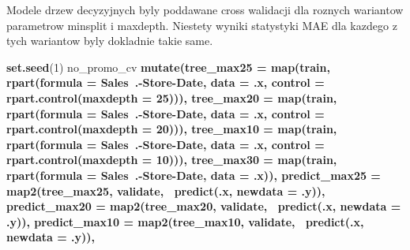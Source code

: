 \documentclass[]{article}
\newenvironment{Shaded}{\begin{snugshade}}{\end{snugshade}}
\newcommand{\DataTypeTok}[1]{\textcolor[rgb]{0.13,0.29,0.53}{#1}}
\newcommand{\DecValTok}[1]{\textcolor[rgb]{0.00,0.00,0.81}{#1}}
\newcommand{\KeywordTok}[1]{\textcolor[rgb]{0.13,0.29,0.53}{\textbf{#1}}}
\newcommand{\NormalTok}[1]{#1}
\newcommand{\OperatorTok}[1]{\textcolor[rgb]{0.81,0.36,0.00}{\textbf{#1}}}
\newcommand{\StringTok}[1]{\textcolor[rgb]{0.31,0.60,0.02}{#1}}
\begin{document}
Modele drzew decyzyjnych byly poddawane cross walidacji dla roznych
wariantow parametrow minsplit i maxdepth. Niestety wyniki statystyki MAE
dla kazdego z tych wariantow byly dokladnie takie same.

\begin{Shaded}
\begin{Highlighting}[]
\KeywordTok{set.seed}\NormalTok{(}\DecValTok{1}\NormalTok{)}
\NormalTok{no_promo_cv }\OperatorTok{%>%}\StringTok{ }
\StringTok{  }\KeywordTok{mutate}\NormalTok{(}\DataTypeTok{tree_max25 =} \KeywordTok{map}\NormalTok{(train, }\OperatorTok{~}\StringTok{ }\KeywordTok{rpart}\NormalTok{(}\DataTypeTok{formula =}\NormalTok{ Sales}\OperatorTok{~}\NormalTok{.}\OperatorTok{-}\NormalTok{Store}\OperatorTok{-}\NormalTok{Date, }\DataTypeTok{data =}\NormalTok{ .x, }\DataTypeTok{control =} \KeywordTok{rpart.control}\NormalTok{(}\DataTypeTok{maxdepth =} \DecValTok{25}\NormalTok{))),}
         \DataTypeTok{tree_max20 =} \KeywordTok{map}\NormalTok{(train, }\OperatorTok{~}\StringTok{ }\KeywordTok{rpart}\NormalTok{(}\DataTypeTok{formula =}\NormalTok{ Sales}\OperatorTok{~}\NormalTok{.}\OperatorTok{-}\NormalTok{Store}\OperatorTok{-}\NormalTok{Date, }\DataTypeTok{data =}\NormalTok{ .x, }\DataTypeTok{control =} \KeywordTok{rpart.control}\NormalTok{(}\DataTypeTok{maxdepth =} \DecValTok{20}\NormalTok{))),}
         \DataTypeTok{tree_max10 =} \KeywordTok{map}\NormalTok{(train, }\OperatorTok{~}\StringTok{ }\KeywordTok{rpart}\NormalTok{(}\DataTypeTok{formula =}\NormalTok{ Sales}\OperatorTok{~}\NormalTok{.}\OperatorTok{-}\NormalTok{Store}\OperatorTok{-}\NormalTok{Date, }\DataTypeTok{data =}\NormalTok{ .x, }\DataTypeTok{control =} \KeywordTok{rpart.control}\NormalTok{(}\DataTypeTok{maxdepth =} \DecValTok{10}\NormalTok{))),}
         \DataTypeTok{tree_max30 =} \KeywordTok{map}\NormalTok{(train, }\OperatorTok{~}\StringTok{ }\KeywordTok{rpart}\NormalTok{(}\DataTypeTok{formula =}\NormalTok{ Sales}\OperatorTok{~}\NormalTok{.}\OperatorTok{-}\NormalTok{Store}\OperatorTok{-}\NormalTok{Date, }\DataTypeTok{data =}\NormalTok{ .x)),}
         \DataTypeTok{predict_max25 =} \KeywordTok{map2}\NormalTok{(tree_max25, validate, }\OperatorTok{~}\KeywordTok{predict}\NormalTok{(.x, }\DataTypeTok{newdata =}\NormalTok{ .y)),}
         \DataTypeTok{predict_max20 =} \KeywordTok{map2}\NormalTok{(tree_max20, validate, }\OperatorTok{~}\KeywordTok{predict}\NormalTok{(.x, }\DataTypeTok{newdata =}\NormalTok{ .y)),}
         \DataTypeTok{predict_max10 =} \KeywordTok{map2}\NormalTok{(tree_max10, validate, }\OperatorTok{~}\KeywordTok{predict}\NormalTok{(.x, }\DataTypeTok{newdata =}\NormalTok{ .y)),}
}
\end{Highlighting}
\end{Shaded}
\end{document}
